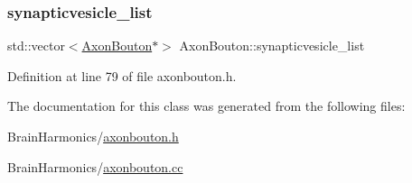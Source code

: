 \subsubsection{\texorpdfstring{synapticvesicle\+\_\+list}{synapticvesicle\_list}}
{\footnotesize\ttfamily std\+::vector$<$\hyperlink{class_axon_bouton}{Axon\+Bouton}$\ast$$>$ Axon\+Bouton\+::synapticvesicle\+\_\+list\hspace{0.3cm}{\ttfamily [protected]}}



Definition at line 79 of file axonbouton.\+h.



The documentation for this class was generated from the following files\+:\begin{DoxyCompactItemize}
\item 
Brain\+Harmonics/\hyperlink{axonbouton_8h}{axonbouton.\+h}\item 
Brain\+Harmonics/\hyperlink{axonbouton_8cc}{axonbouton.\+cc}\end{DoxyCompactItemize}
